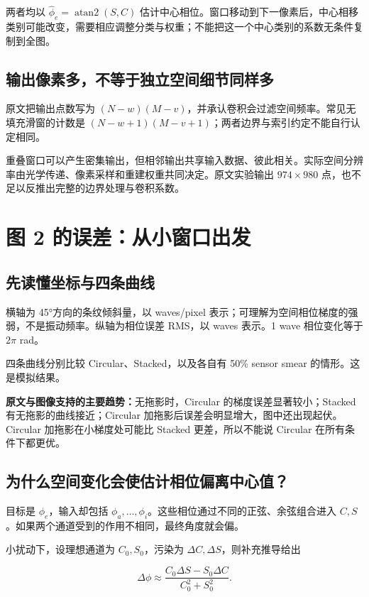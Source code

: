 \documentclass[UTF8,fontset=fandol,11pt,a4paper]{ctexart}
\begin{document}
两者均以 \(\hat\phi_e=\operatorname{atan2}(S,C)\) 估计中心相位。窗口移动到下一像素后，中心相移类别可能改变，需要相应调整分类与权重；不能把这一个中心类别的系数无条件复制到全图。

\subsection{输出像素多，不等于独立空间细节同样多}

原文把输出点数写为 \((N-w)(M-v)\)，并承认卷积会过滤空间频率。常见无填充滑窗的计数是 \((N-w+1)(M-v+1)\)；两者边界与索引约定不能自行认定相同。

重叠窗口可以产生密集输出，但相邻输出共享输入数据、彼此相关。实际空间分辨率由光学传递、像素采样和重建权重共同决定。原文实验输出 \(974\times980\) 点，也不足以反推出完整的边界处理与卷积系数。

\section{图 2 的误差：从小窗口出发}

\subsection{先读懂坐标与四条曲线}

横轴为 45°方向的条纹倾斜量，以 waves/pixel 表示；可理解为空间相位梯度的强弱，不是振动频率。纵轴为相位误差 RMS，以 waves 表示。1 wave 相位变化等于 \(2\pi\) rad。

四条曲线分别比较 Circular、Stacked，以及各自有 50\% sensor smear 的情形。这是模拟结果。

\textbf{原文与图像支持的主要趋势：}无拖影时，Circular 的梯度误差显著较小；Stacked 有无拖影的曲线接近；Circular 加拖影后误差会明显增大，图中还出现起伏。Circular 加拖影在小梯度处可能比 Stacked 更差，所以不能说 Circular 在所有条件下都更优。

\subsection{为什么空间变化会使估计相位偏离中心值？}

目标是 \(\phi_e\)，输入却包括 \(\phi_a,\ldots,\phi_i\)。这些相位通过不同的正弦、余弦组合进入 \(C,S\)。如果两个通道受到的作用不相同，最终角度就会偏。

小扰动下，设理想通道为 \(C_0,S_0\)，污染为 \(\Delta C,\Delta S\)，则补充推导给出

\[
\Delta\phi\approx\frac{C_0\Delta S-S_0\Delta C}{C_0^2+S_0^2}.
\]
\end{document}
